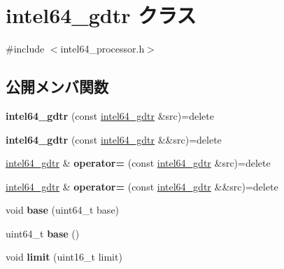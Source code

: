 \hypertarget{classintel64__gdtr}{}\section{intel64\+\_\+gdtr クラス}
\label{classintel64__gdtr}


{\ttfamily \#include $<$intel64\+\_\+processor.\+h$>$}

\subsection*{公開メンバ関数}
\begin{DoxyCompactItemize}
\item 
\hypertarget{classintel64__gdtr_a92149e5369c4f35d2362c352e603633d}{}{\bfseries intel64\+\_\+gdtr} (const \hyperlink{classintel64__gdtr}{intel64\+\_\+gdtr} \&src)=delete\label{classintel64__gdtr_a92149e5369c4f35d2362c352e603633d}

\item 
\hypertarget{classintel64__gdtr_a48ba8bca138e66c87612a8fc463049c8}{}{\bfseries intel64\+\_\+gdtr} (const \hyperlink{classintel64__gdtr}{intel64\+\_\+gdtr} \&\&src)=delete\label{classintel64__gdtr_a48ba8bca138e66c87612a8fc463049c8}

\item 
\hypertarget{classintel64__gdtr_ab705898205d714e2106fb3d9644a4c93}{}\hyperlink{classintel64__gdtr}{intel64\+\_\+gdtr} \& {\bfseries operator=} (const \hyperlink{classintel64__gdtr}{intel64\+\_\+gdtr} \&src)=delete\label{classintel64__gdtr_ab705898205d714e2106fb3d9644a4c93}

\item 
\hypertarget{classintel64__gdtr_a0d73a6320ba02bae68e79c4a2157366e}{}\hyperlink{classintel64__gdtr}{intel64\+\_\+gdtr} \& {\bfseries operator=} (const \hyperlink{classintel64__gdtr}{intel64\+\_\+gdtr} \&\&src)=delete\label{classintel64__gdtr_a0d73a6320ba02bae68e79c4a2157366e}

\item 
\hypertarget{classintel64__gdtr_ad7655d8747d5497cbb7b41dded0583d9}{}void {\bfseries base} (uint64\+\_\+t base)\label{classintel64__gdtr_ad7655d8747d5497cbb7b41dded0583d9}

\item 
\hypertarget{classintel64__gdtr_ad6724b7696843466f0dd04548a7d8a10}{}uint64\+\_\+t {\bfseries base} ()\label{classintel64__gdtr_ad6724b7696843466f0dd04548a7d8a10}

\item 
\hypertarget{classintel64__gdtr_ad981f2ffb9bc4af7e2010b39c885ce78}{}void {\bfseries limit} (uint16\+\_\+t limit)\label{classintel64__gdtr_ad981f2ffb9bc4af7e2010b39c885ce78}


\end{DoxyCompactItemize}
